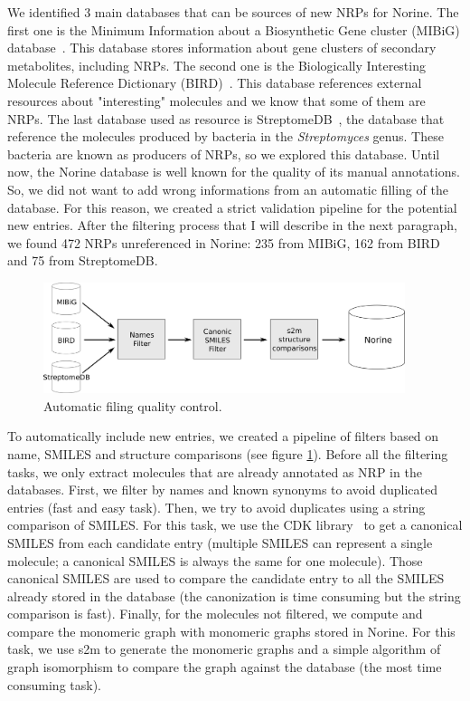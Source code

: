 \documentclass[long, final]{jobim2017}
\begin{document}
We identified 3 main databases that can be sources of new NRPs for Norine.
The first one is the Minimum Information about a Biosynthetic Gene cluster (MIBiG) database~\cite{_mibig:_????}.
This database stores information about gene clusters of secondary metabolites, including NRPs.
The second one is the Biologically Interesting Molecule Reference Dictionary (BIRD)~\cite{berman_announcing_2003}.
This database references external resources about "interesting" molecules and we know that some of them are NRPs.
The last database used as resource is StreptomeDB~\cite{lucas_streptomedb:_2013}, the database that reference the molecules produced by bacteria in the \textit{Streptomyces} genus.
These bacteria are known as producers of NRPs, so we explored this database.
Until now, the Norine database is well known for the quality of its manual annotations.
So, we did not want to add wrong informations from an automatic filling of the database. For this reason, we created a strict validation pipeline for the potential new entries.
After the filtering process that I will describe in the next paragraph, we found 472 NRPs unreferenced in Norine: 235 from MIBiG, 162 from BIRD and 75 from StreptomeDB.

 \begin{figure}
   \begin{center}
     \includegraphics[width=400px]{figs/filters.png}
   \end{center}
   \caption{Automatic filing quality control.}
   \label{fig:quality}
 \end{figure}

To automatically include new entries, we created a pipeline of filters based on name, SMILES and structure comparisons (see figure \ref{fig:quality}).
Before all the filtering tasks, we only extract molecules that are already annotated as NRP in the databases.
First, we filter by names and known synonyms to avoid duplicated entries (fast and easy task).
Then, we try to avoid duplicates using a string comparison of SMILES.
For this task, we use the CDK library~\cite{steinbeck_chemistry_2003} to get a canonical SMILES from each candidate entry (multiple SMILES can represent a single molecule; a canonical SMILES is always the same for one molecule).
Those canonical SMILES are used to compare the candidate entry to all the SMILES already stored in the database (the canonization is time consuming but the string comparison is fast).
Finally, for the molecules not filtered, we compute and compare the monomeric graph with monomeric graphs stored in Norine.
For this task, we use s2m to generate the monomeric graphs and a simple algorithm of graph isomorphism to compare the graph against the database (the most time consuming task).
\end{document}
